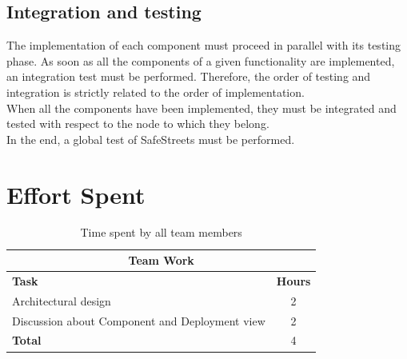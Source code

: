 \documentclass{article}
\begin{document}
		\subsection{Integration and testing}
			The implementation of each component must proceed in parallel with its testing phase. As soon as all the components of a given functionality are implemented, an integration test must be performed. Therefore, the order of testing and integration is strictly related to the order of implementation.\\
			When all the components have been implemented, they must be integrated and tested with respect to the node to which they belong.\\
			In the end, a global test of SafeStreets must be performed.\\
	
	\clearpage
	\section{Effort Spent}
		\begin{table}[h]
			\centering
			\begin{tabular}{l c}
				\hline\hline
				\multicolumn{2}{c}{\textbf{Team Work}} \\
				\hline
				\textbf{Task} & \textbf{Hours} \\ [0.5ex]
				\hline
				Architectural design & 2  \\
				Discussion about Component and Deployment view & 2 \\
				\hline
				\textbf{Total} & 4  \\
				\hline
			\end{tabular}
			\caption{Time spent by all team members}
			\label{fig:Time spent by all team members}
		\end{table}
		
\end{document}
